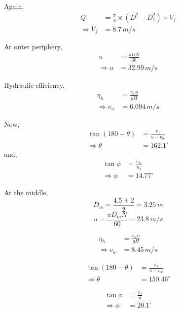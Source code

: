 \documentclass{article}
\begin{document}
\begin{multicols}{2}
  Again,
  \begin{align*}
    Q &= \frac{\pi}{4} \times (D^2 - D_1^2) \times V_f \\
    \Rightarrow V_f &= 8.7 \, m/s
  \end{align*}

  At outer periphery,
  \begin{align*}
    u &= \frac{\pi D N}{60} \\
    \Rightarrow u &= 32.99 \, m/s
  \end{align*}

  Hydraulic efficiency,
  \begin{align*}
    \eta_h &= \frac{v_w u}{gH} \\
    \Rightarrow v_w &= 6.094 \, m/s
  \end{align*}

  Now,
  \begin{align*}
    \tan (180 - \theta) &= \frac{v_f}{u - v_w} \\
    \Rightarrow \theta &= 162.1^{\circ}
  \end{align*}
  and,
  \begin{align*}
    \tan \phi &= \frac{v_{f1}}{u_1} \\
    \Rightarrow \phi &= 14.77^{\circ}
  \end{align*}

  At the middle,
  $$D_m = \frac{4.5 + 2}{2} = 3.25 \, m$$
  $$u = \frac{\pi D_m N}{60} = 23.8 \, m/s$$

  \begin{align*}
    \eta_h &= \frac{v_w u}{gH} \\
    \Rightarrow v_w &= 8.45 \, m/s
  \end{align*}
  
  \begin{align*}
    \tan (180 - \theta) &= \frac{v_f}{u - v_w} \\
    \Rightarrow \theta &= 150.46^{\circ}
  \end{align*}

  \begin{align*}
    \tan \phi &= \frac{v_{f}}{u} \\
    \Rightarrow \phi &= 20.1^{\circ}
  \end{align*}
\end{multicols}
  
\end{document}
